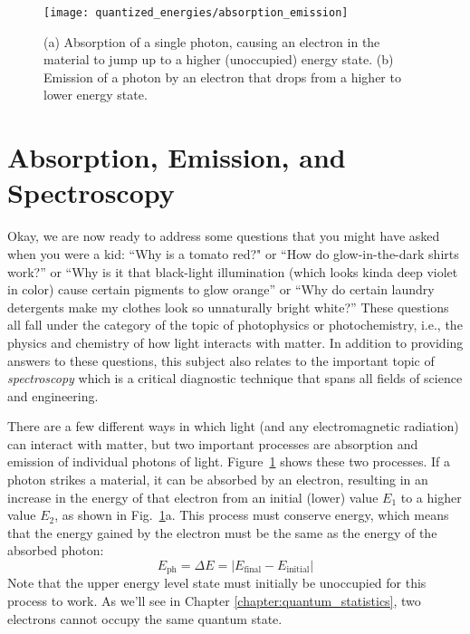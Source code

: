 \begin{figure}[!t]
\begin{center}
\texttt{[image: quantized\_energies/absorption\_emission]}
\end{center}
\caption{(a) Absorption of a single photon, causing an electron in
the material to jump up to a higher (unoccupied) energy state. (b) Emission
of a photon by an electron that drops from a higher to lower energy
state.}
\label{fig:absorption_emission}
\end{figure}

\section{Absorption, Emission, and Spectroscopy}

Okay, we are now ready to address some questions that you might have asked
when you were a kid: ``Why is a tomato red?" or ``How do glow-in-the-dark
shirts work?'' or ``Why is it that black-light illumination (which looks
kinda deep violet in color) cause certain pigments to glow orange'' or
``Why do certain laundry detergents make my clothes look so unnaturally
bright white?'' These questions all fall under the category of the topic
of photophysics or photochemistry, i.e., the physics and chemistry of
how light interacts with matter. In addition to providing answers to
these questions, this subject also relates to the important topic of
{\it spectroscopy} which is a critical diagnostic technique that spans
all fields of science and engineering.

There are a few different ways in which light (and any
electromagnetic radiation) can interact with matter, but two important
processes are absorption and emission of individual photons of
light. Figure~\ref{fig:absorption_emission} shows these two processes.
If a photon strikes a material, it can be absorbed by an electron,
resulting in an increase in the energy of that electron from an
initial (lower) value $E_1$ to a higher value $E_2$, as shown in
Fig.~\ref{fig:absorption_emission}a. This process must conserve energy,
which means that the energy gained by the electron must be the same as
the energy of the absorbed photon:
\begin{equation}
\label{eq:photon_energy}
E_\text{ph} = \Delta E = |E_\text{final} - E_\text{initial}|
\end{equation} 
Note that the upper energy level state must initially be unoccupied for
this process to work. As we'll see in Chapter \ref{chapter:quantum_statistics},
two electrons cannot occupy the same quantum state.

